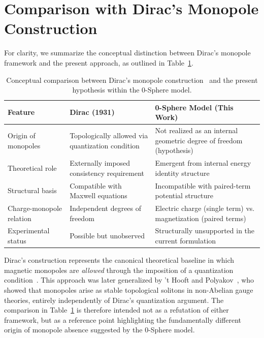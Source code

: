 \documentclass[12pt,letterpaper]{article}
\begin{document}
\section{Comparison with Dirac's Monopole Construction}

For clarity, we summarize the conceptual distinction between Dirac's monopole framework and the present approach, as outlined in Table~\ref{tab:dirac_comparison}.

\begin{table}[t!]
\centering
\renewcommand{\arraystretch}{1.3}
\begin{tabularx}{\textwidth}{l X X}
\toprule
\textbf{Feature} & \textbf{Dirac (1931)~\cite{Dirac1931}} & \textbf{0-Sphere Model (This Work)} \\
\midrule
Origin of monopoles & Topologically allowed via quantization condition & Not realized as an internal geometric degree of freedom (hypothesis) \\
Theoretical role & Externally imposed consistency requirement & Emergent from internal energy identity structure \\
Structural basis & Compatible with Maxwell equations & Incompatible with paired-term potential structure \\
Charge-monopole relation & Independent degrees of freedom & Electric charge (single term) vs. magnetization (paired terms) \\
Experimental status & Possible but unobserved & Structurally unsupported in the current formulation \\
\bottomrule
\end{tabularx}
\caption{Conceptual comparison between Dirac's monopole construction~\cite{Dirac1931} and the present hypothesis within the 0-Sphere model.}
\label{tab:dirac_comparison}
\end{table}

Dirac's construction represents the canonical theoretical baseline in which magnetic monopoles are \emph{allowed} through the imposition of a quantization condition~\cite{Dirac1931}. This approach was later generalized by 't Hooft and Polyakov~\cite{tHooft1974,Polyakov1974}, who showed that monopoles arise as stable topological solitons in non-Abelian gauge theories, entirely independently of Dirac's quantization argument. The comparison in Table~\ref{tab:dirac_comparison} is therefore intended not as a refutation of either framework, but as a reference point highlighting the fundamentally different origin of monopole absence suggested by the 0-Sphere model.
\end{document}
